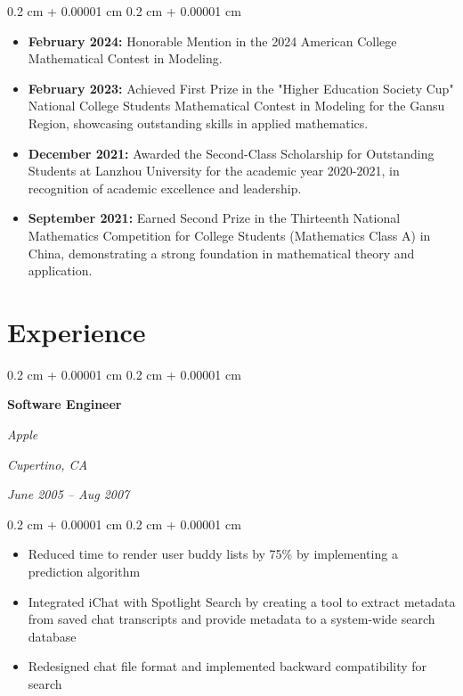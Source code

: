 \documentclass[10pt, letterpaper]{article}
\newenvironment{highlights}{
    \begin{itemize}[
        topsep=0.10 cm,
        parsep=0.10 cm,
        partopsep=0pt,
        itemsep=0pt,
        leftmargin=0.4 cm + 10pt
    ]
}{
    \end{itemize}
} %
\newenvironment{highlightsforbulletentries}{
    \begin{itemize}[
        topsep=0.10 cm,
        parsep=0.10 cm,
        partopsep=0pt,
        itemsep=0pt,
        leftmargin=10pt
    ]
}{
    \end{itemize}
} %
\newenvironment{onecolentry}{
    \begin{adjustwidth}{
        0.2 cm + 0.00001 cm
    }{
        0.2 cm + 0.00001 cm
    }
}{
    \end{adjustwidth}
} %
\newenvironment{twocolentry}[2][]{
    \onecolentry
    \def\secondColumn{#2}
    \setcolumnwidth{\fill, 5.5 cm}
    \begin{paracol}{2}
}{
    \switchcolumn \raggedleft \secondColumn
    \end{paracol}
    \endonecolentry
} %
\begin{document}
    \begin{onecolentry}
        \begin{highlightsforbulletentries}

        \item \textbf{February 2024:} Honorable Mention in the 2024 American College Mathematical Contest in Modeling.

        \item \textbf{February 2023:} Achieved First Prize in the "Higher Education Society Cup" National College Students Mathematical Contest in Modeling for the Gansu Region, showcasing outstanding skills in applied mathematics.

        \item \textbf{December 2021:} Awarded the Second-Class Scholarship for Outstanding Students at Lanzhou University for the academic year 2020-2021, in recognition of academic excellence and leadership.

        \item \textbf{September 2021:} Earned Second Prize in the Thirteenth National Mathematics Competition for College Students (Mathematics Class A) in China, demonstrating a strong foundation in mathematical theory and application.

        \end{highlightsforbulletentries}
    \end{onecolentry}

    

    
    \section{Experience}
        \begin{twocolentry}{
        \textit{Cupertino, CA}    
            
        \textit{June 2005 – Aug 2007}}
            \textbf{Software Engineer}
            
            \textit{Apple}
        \end{twocolentry}

        \vspace{0.10 cm}
        \begin{onecolentry}
            \begin{highlights}
                \item Reduced time to render user buddy lists by 75\% by implementing a prediction algorithm
                \item Integrated iChat with Spotlight Search by creating a tool to extract metadata from saved chat transcripts and provide metadata to a system-wide search database
                \item Redesigned chat file format and implemented backward compatibility for search
            \end{highlights}
        \end{onecolentry}
\end{document}
